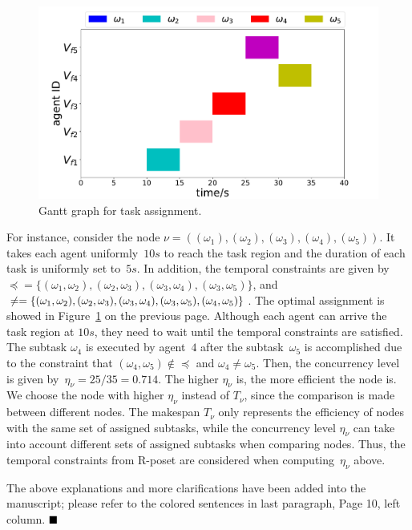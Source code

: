 \documentclass[10pt]{article}
\begin{document}
\begin{figure}[ht]
	\centering
	\includegraphics[scale=0.20]{figs/example_gantt.pdf}
	\caption{Gantt graph for task assignment.}
	\label{fig:gantt_example}
\end{figure}

For instance, consider the node $\nu=((\omega_1),(\omega_2),(\omega_3),(\omega_4),(\omega_5))$.
It takes each agent uniformly~$10s$ to reach the task region and the duration of each task is uniformly set to~$5s$.
In addition, the temporal constraints are given by~$\preceq=\{(\omega_1,\omega_2), (\omega_2,\omega_3), (\omega_3,\omega_4),(\omega_3,\omega_5)\}$,
and $\neq=\{(\omega_1,\omega_2),(\omega_2,\omega_3),
(\omega_3,\omega_4),(\omega_3,\omega_5),\\(\omega_4,\omega_5)\}$.
The optimal assignment is showed in Figure~\ref{fig:gantt_example} on the previous page.
Although each agent can arrive the task region at $10s$,
they need to wait until the temporal constraints are satisfied.
The subtask $\omega_4$ is executed by agent~$4$ after the subtask~$\omega_5$ is accomplished
due to the constraint that $(\omega_4,\omega_5)\not\in\preceq$ and $\omega_4\neq\omega_5$.
Then, the concurrency level is given by~$\eta_\nu=25/35=0.714$.
The higher $\eta_\nu$ is, the more efficient the node is.
We choose the node with higher $\eta_\nu$ instead of $T_\nu$, since
the comparison is made between different nodes.
The makespan $T_\nu$ only represents the efficiency
of nodes with the same set of assigned subtasks,
while the concurrency level $\eta_\nu$ can take into account different sets of assigned subtasks when comparing nodes.
Thus, the temporal constraints from R-poset are considered when computing~$\eta_{\nu}$ above.


The above explanations and more clarifications have been added into the manuscript; please refer to the colored sentences in last paragraph, Page 10, left column.
$\hfill\blacksquare$
\end{document}

